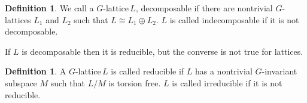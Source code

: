 \documentclass{article}
\theoremstyle{plain}
\newtheorem{lemma}[theorem]{Lemma}
\theoremstyle{definition}
\newtheorem{definition}[theorem]{Definition}
\newcommand{\Z}{\ensuremath{\mathbb{Z}}}
\newcommand{\G}{G}
\newcommand{\glat}{$G$-lattice}
\begin{document}
\begin{definition}
We call a \glat \,$L$, decomposable if there are nontrivial \glat s $L_1$ and $ L_2$ such that $ L\cong L_1 \oplus L_2$. $L$ is called indecomposable if it is not decomposable.
\end{definition}
\noindent
If $L$ is decomposable then it is reducible, but the converse is not true for lattices.
\begin{definition}
A \glat \,$L$ is called reducible if $L$ has a nontrivial $G$-invariant subspace $M$ such that $L/M$ is torsion free. $L$ is called irreducible if it is not reducible. 
\end{definition}
\end{document}
